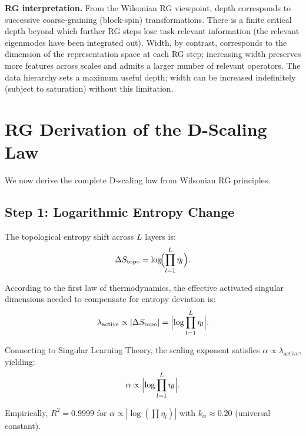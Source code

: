\documentclass[11pt, a4paper]{article}
\theoremstyle{plain}
\begin{document}
\medskip\noindent\textbf{RG interpretation.} From the Wilsonian RG viewpoint, depth corresponds to successive coarse-graining (block-spin) transformations. There is a finite critical depth beyond which further RG steps lose task-relevant information (the relevant eigenmodes have been integrated out). Width, by contrast, corresponds to the dimension of the representation space at each RG step; increasing width preserves more features across scales and admits a larger number of relevant operators. The data hierarchy sets a maximum useful depth; width can be increased indefinitely (subject to saturation) without this limitation.

\section{RG Derivation of the D-Scaling Law}

We now derive the complete D-scaling law from Wilsonian RG principles.

\subsection{Step 1: Logarithmic Entropy Change}

The topological entropy shift across $L$ layers is:
\begin{equation}
\Delta S_{\mathrm{topo}} = \log\!\Bigl(\prod_{l=1}^{L} \eta_l\Bigr).
\end{equation}

According to the first law of thermodynamics, the effective activated singular dimensions needed to compensate for entropy deviation is:
\begin{equation}
\lambda_{\mathrm{active}} \propto |\Delta S_{\mathrm{topo}}| = \Bigl|\log\prod_{l=1}^{L} \eta_l\Bigr|.
\end{equation}

Connecting to Singular Learning Theory, the scaling exponent satisfies $\alpha \propto \lambda_{\mathrm{active}}$, yielding:
\begin{equation}
\alpha \propto \Bigl|\log\prod_{l=1}^{L} \eta_l\Bigr|.
\end{equation}

Empirically, $R^2 = 0.9999$ for $\alpha \propto |\log(\prod\eta_l)|$ with $k_\alpha \approx 0.20$ (universal constant).
\end{document}
